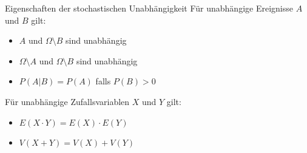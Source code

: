 \begin{theorem}{Eigenschaften der stochastischen Unabhängigkeit}
Für unabhängige Ereignisse $A$ und $B$ gilt:
\begin{itemize}
    \item $A$ und $\Omega \setminus B$ sind unabhängig
    \item $\Omega \setminus A$ und $\Omega \setminus B$ sind unabhängig
    \item $P(A|B) = P(A)$ falls $P(B) > 0$
\end{itemize}

Für unabhängige Zufallsvariablen $X$ und $Y$ gilt:
\begin{itemize}
    \item $E(X \cdot Y) = E(X) \cdot E(Y)$
    \item $V(X + Y) = V(X) + V(Y)$
\end{itemize}
\end{theorem}